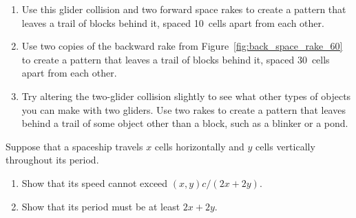 \begin{multicols}{2}
\begin{problem}
		\begin{center}
		\end{center}
		\begin{enumerate}[label=\bf\color{ocre}(\alph*)]
			\item Use this glider collision and two forward space rakes to create a pattern that leaves a trail of blocks behind it, spaced 10~cells apart from each other.
			
			\item Use two copies of the backward rake from Figure~\ref{fig:back_space_rake_60} to create a pattern that leaves a trail of blocks behind it, spaced 30~cells apart from each other.
			
			\item Try altering the two-glider collision slightly to see what other types of objects you can make with two gliders. Use two rakes to create a pattern that leaves behind a trail of some object other than a block, such as a blinker or a pond.
%
		\end{enumerate}
	\end{problem}
	
	
	\mfilbreak
	
	
	\begin{problem}\label{exer:general_speed_limit} 
		Suppose that a spaceship travels $x$ cells horizontally and $y$ cells vertically throughout its period.\smallskip
		
		\begin{enumerate}[label=\bf\color{ocre}(\alph*)]
			\item Show that its speed cannot exceed $(x,y)c/(2x+2y)$.
			
			\item Show that its period must be at least $2x+2y$.
			

\end{enumerate}
\end{problem}
\end{multicols}
